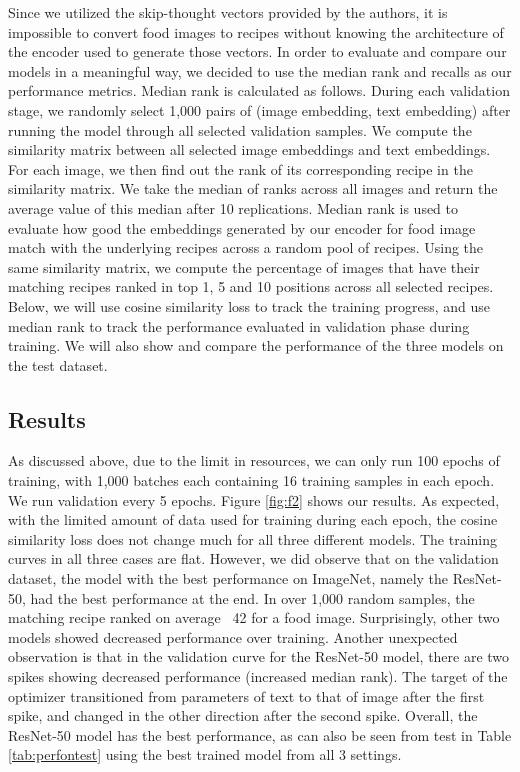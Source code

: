 \documentclass[10pt,twocolumn,letterpaper]{article}
\begin{document}
Since we utilized the skip-thought vectors provided by the authors, it is impossible to convert food images to recipes without knowing the architecture of the encoder used to generate those vectors.  In order to evaluate and compare our models in a meaningful way, we decided to use the median rank and recalls as our performance metrics.  Median rank is calculated as follows.  During each validation stage, we randomly select 1,000 pairs of (image embedding, text embedding) after running the model through all selected validation samples.  We compute the similarity matrix between all selected image embeddings and text embeddings.  For each image, we then find out the rank of its corresponding recipe in the similarity matrix.  We take the median of ranks across all images and return the average value of this median after 10 replications.  Median rank is used to evaluate how good the embeddings generated by our encoder for food image match with the underlying recipes across a random pool of recipes.  Using the same similarity matrix, we compute the percentage of images that have their matching recipes ranked in top 1, 5 and 10 positions across all selected recipes.  Below, we will use cosine similarity loss to track the training progress, and use median rank to track the performance evaluated in validation phase during training.  We will also show and compare the performance of the three models on the test dataset.

\subsection{Results}
As discussed above, due to the limit in resources, we can only run 100 epochs of training, with 1,000 batches each containing 16 training samples in each epoch.  We run validation every 5 epochs.  Figure \ref{fig:f2} shows our results.  As expected, with the limited amount of data used for training during each epoch, the cosine similarity loss does not change much for all three different models.  The training curves in all three cases are flat.  However, we did observe that on the validation dataset, the model with the best performance on ImageNet, namely the ResNet-50, had the best performance at the end.  In over 1,000 random samples, the matching recipe ranked on average ~42 for a food image.  Surprisingly, other two models showed decreased performance over training.  Another unexpected observation is that in the validation curve for the ResNet-50 model, there are two spikes showing decreased performance (increased median rank).  The target of the optimizer transitioned from parameters of text to that of image after the first spike, and changed in the other direction after the second spike.  Overall, the ResNet-50 model has the best performance, as can also be seen from test in Table \ref{tab:perfontest} using the best trained model from all 3 settings.
\end{document}
